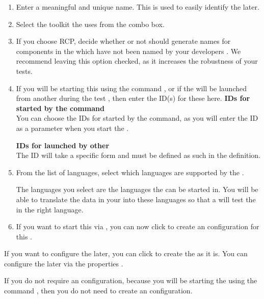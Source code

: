 \begin{enumerate}
\item Enter a meaningful and unique \gdaut{} name. This is used to easily identify the \gdaut{} later. 
\item Select the toolkit the \gdaut{} uses from the combo box. 
\item If you choose RCP, decide whether or not \app{} should generate names for components in the \gdaut{} which have not been named by your developers . We recommend leaving this option checked, as it increases the robustness of your tests. 
\item If you will be starting this \gdaut{} using the  command , or if the \gdaut{} will be launched from another \gdaut{} during the test , then enter the ID(s) for these \gdauts{} here. 
\textbf{IDs for \gdauts{} started by the  command}\\
You can choose the \gdaut{} IDs for \gdauts{} started by the  command, as you will enter the \gdaut{} ID as a parameter when you start the \gdaut{} .

\textbf{IDs for \gdauts{} launched by other \gdauts{}}\\
The \gdaut{} ID will take a specific form  and must be defined as such in the \gdaut{} definition.
 
\item From the list of \gdproject{} languages, select which languages are supported by the \gdaut{}. 

The languages you select are the languages the \gdaut{} can be started in.  You will be able to translate the data in your \gdcases{} into these languages so that a \gdsuite{} will test the \gdaut{} in the right language. 


\item If you want to start this \gdaut{} via \app{}, you can now click  to create an \gdaut{} configuration for this \gdaut{} .
\end{enumerate}

If you want to  configure the \gdaut{} later, you can click  to create the \gdproject{} as it is. You can configure the \gdaut{} later via the \gdproject{} properties . 

If you do not require an \gdaut{} configuration, because you will be starting the \gdaut{} using the  command , then you do not need to create an \gdaut{} configuration. 

\clearpage
